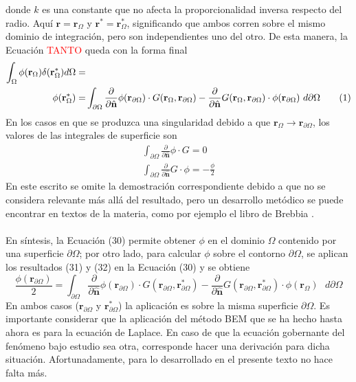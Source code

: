 \documentclass[12pt, oneside, numbers, spanish]{ezthesis}
\newcommand\numberthis{\addtocounter{equation}{1}\tag{\theequation}}
\numberwithin{equation}{section}
\begin{document}
donde $k$ es una constante que no afecta la proporcionalidad inversa respecto del radio. Aquí $\mathbf{r} = \mathbf{r}_\Omega$ y $\mathbf{r}^* = \mathbf{r}_\Omega^*$, significando que ambos corren sobre el mismo dominio de integración, pero son independientes uno del otro. De esta manera, la Ecuación \textcolor{red}{TANTO} queda con la forma final
\begin{align*}
\int_\Omega\phi(\mathbf{r}_\Omega)\delta(\mathbf{r}_\Omega^*)d\Omega=&\\
\phi(\mathbf{r}_\Omega^*)=&\int_{\partial\Omega}\frac{\partial}{\partial\hat{\mathbf{n}}}\phi(\mathbf{r}_{\partial\Omega})\cdot G(\mathbf{r}_\Omega,\mathbf{r}_{\partial\Omega}) - \frac{\partial}{\partial\hat{\mathbf{n}}}G(\mathbf{r}_\Omega,\mathbf{r}_{\partial\Omega})\cdot\phi(\mathbf{r}_{\partial\Omega})\text{ }d\partial\Omega \numberthis
\end{align*}
En los casos en que se produzca una singularidad debido a que $\mathbf{r}_\Omega \rightarrow \mathbf{r}_{\partial\Omega}$, los valores de las integrales de superficie son
\begin{gather}
\int_{\partial\Omega}\frac{\partial}{\partial\hat{\mathbf{n}}}\phi\cdot G = 0\\
\int_{\partial\Omega}\frac{\partial}{\partial\hat{\mathbf{n}}} G\cdot\phi = -\frac{\phi}{2}
\end{gather}
En este escrito se omite la demostración correspondiente debido a que no se considera relevante más allá del resultado, pero un desarrollo metódico se puede encontrar en textos de la materia, como por ejemplo el libro de Brebbia \cite{Brebbia}.\\\\
En síntesis, la Ecuación (30) permite obtener $\phi$ en el dominio $\Omega$ contenido por una superficie $\partial\Omega$; por otro lado, para calcular $\phi$ sobre el contorno $\partial\Omega$, se aplican los resultados (31) y (32) en la Ecuación (30) y se obtiene
\begin{equation}
\frac{\phi(\mathbf{r}_{\partial\Omega})}{2} = \int_{\partial\Omega}\frac{\partial}{\partial\hat{\mathbf{n}}}\phi(\mathbf{r}_{\partial\Omega})\cdot G(\mathbf{r}_{\partial\Omega},\mathbf{r}_{\partial\Omega}^*) - \frac{\partial}{\partial\hat{\mathbf{n}}}G(\mathbf{r}_{\partial\Omega},\mathbf{r}_{\partial\Omega}^*)\cdot\phi(\mathbf{r}_\Omega)\text{ }d\partial\Omega
\end{equation}
En ambos casos ($\mathbf{r}_{\partial\Omega}$ y $\mathbf{r}_{\partial\Omega}^*$) la aplicación es sobre la misma superficie $\partial\Omega$. Es importante considerar que la aplicación del método BEM que se ha hecho hasta ahora es para la ecuación de Laplace. En caso de que la ecuación gobernante del fenómeno bajo estudio sea otra, corresponde hacer una derivación para dicha situación. Afortunadamente, para lo desarrollado en el presente texto no hace falta más.
\end{document}
